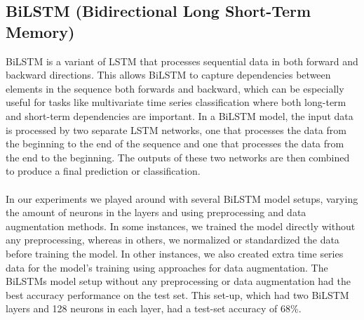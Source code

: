 \documentclass[11pt, oneside]{article}
\begin{document}
\subsection{BiLSTM (Bidirectional Long Short-Term Memory)}
BiLSTM is a variant of LSTM that processes sequential data in both forward and backward directions. This allows BiLSTM to capture dependencies between elements in the sequence both forwards and backward, which can be especially useful for tasks like multivariate time series classification where both long-term and short-term dependencies are important. In a BiLSTM model, the input data is processed by two separate LSTM networks, one that processes the data from the beginning to the end of the sequence and one that processes the data from the end to the beginning. The outputs of these two networks are then combined to produce a final prediction or classification.\\\\
In our experiments we played around with several BiLSTM model setups, varying the amount of neurons in the layers and using preprocessing and data augmentation methods. In some instances, we trained the model directly without any preprocessing, whereas in others, we normalized or standardized the data before training the model. In other instances, we also created extra time series data for the model's training using approaches for data augmentation.
The BiLSTMs model setup without any preprocessing or data augmentation had the best accuracy performance on the test set. This set-up, which had two BiLSTM layers and 128 neurons in each layer, had a test-set accuracy of 68\%.
\end{document}
